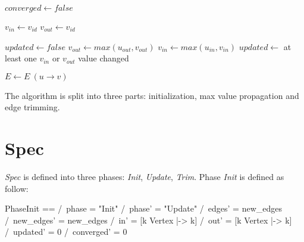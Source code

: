 \begin{algorithmic}[1]

\State $converged \gets false$

    
        \State $v_{in} \gets v_{id}$
        \State $v_{out} \gets v_{id}$
    \EndFor

    \State $updated \gets false$
            \State $v_{out} \gets max(u_{out},v_{out})$
            \State $v_{in} \gets max(u_{in},v_{in})$
        \EndFor
        \State $updated \gets$ at least one $v_{in}$ or $v_{out}$ value changed 
    \EndWhile

            \State $E \gets E \ (u \rightarrow v)$
        \EndIf
    \EndFor

\EndWhile
\end{algorithmic}

The algorithm is split into three parts: initialization, max value
propagation and edge trimming.

\section{Spec}

\textit{Spec} is defined into three phases: \textit{Init}, \textit{Update},
\textit{Trim}. Phase \textit{Init} is defined as follow:\\
\begin{tla}
PhaseInit == 
    /\ phase = "Init" 
    /\ phase' = "Update"
    /\ edges' = new_edges
    /\ new_edges' = new_edges
    /\ in' = [k \in Vertex |-> k]
    /\ out' = [k \in Vertex |-> k]
    /\ updated' = 0
    /\ converged' = 0
\end{tla}
\begin{tlatex}
%
%
%
%
%
%
%
%
%
\end{tlatex}\\

